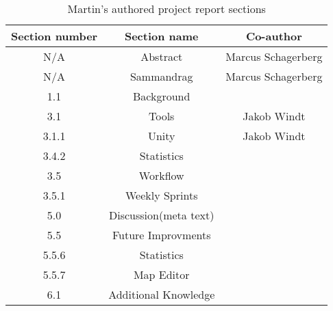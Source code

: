      \begin{table}[ht]
        \centering
            \begin{tabular}{|c|c|c|}
                \hline
                \textbf{Section number} & \textbf{Section name} & \textbf{Co-author}
                \\\hline
                N/A & Abstract & Marcus Schagerberg
                \\\hline
                N/A & Sammandrag & Marcus Schagerberg
                \\\hline
                1.1 & Background &
                \\\hline
                3.1 & Tools & Jakob Windt
                \\\hline
                3.1.1 & Unity & Jakob Windt
                \\\hline
                3.4.2 & Statistics &
                \\\hline
                3.5 & Workflow & 
                \\\hline
                3.5.1 & Weekly Sprints &
                \\\hline
                5.0 & Discussion(meta text) &
                \\\hline
                5.5 & Future Improvments &
                \\\hline
                5.5.6 & Statistics &
                \\\hline
                5.5.7 & Map Editor &
                \\\hline
                6.1 & Additional Knowledge &
                
                \\\hline
            \end{tabular}
        \caption{Martin's authored project report sections}
        \label{Tab:marcus-authored-sections}
    \end{table}